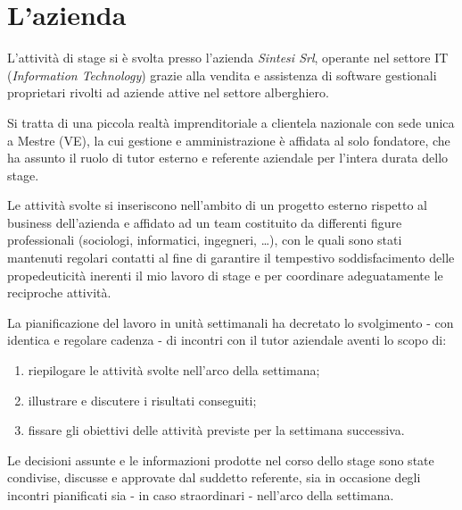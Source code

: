 \chapter{L'azienda}
\label{ch:tesi:azienda}
L'attività di stage si è svolta presso l'azienda \textit{Sintesi Srl}, operante nel settore IT (\textit{Information Technology}) grazie alla vendita e assistenza di software gestionali proprietari rivolti ad aziende attive nel settore alberghiero.

Si tratta di una piccola realtà imprenditoriale a clientela nazionale con sede unica a Mestre (VE), la cui gestione e amministrazione è affidata al solo fondatore, che ha assunto il ruolo di tutor esterno e referente aziendale per l'intera durata dello stage.

Le attività svolte si inseriscono nell'ambito di un progetto esterno rispetto al business dell'azienda e affidato ad un team costituito da differenti figure professionali (sociologi, informatici, ingegneri, \ldots), con le quali sono stati mantenuti regolari contatti al fine di garantire il tempestivo soddisfacimento delle propedeuticità inerenti il mio lavoro di stage e per coordinare adeguatamente le reciproche attività.

La pianificazione del lavoro in unità settimanali ha decretato lo svolgimento - con identica e regolare cadenza - di incontri con il tutor aziendale aventi lo scopo di:
\begin{enumerate}
\item riepilogare le attività svolte nell'arco della settimana;
\item illustrare e discutere i risultati conseguiti;
\item fissare gli obiettivi delle attività previste per la settimana successiva.
\end{enumerate}   

Le decisioni assunte e le informazioni prodotte nel corso dello stage sono state condivise, discusse e approvate dal suddetto referente, sia in occasione degli incontri pianificati sia - in caso straordinari - nell'arco della settimana.
